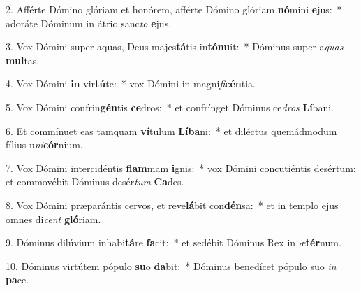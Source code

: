 2. Afférte Dómino glóriam et honórem, afférte Dómino glóriam \textbf{nó}mini \textbf{e}jus:~*  adoráte Dóminum in átrio sanc\textit{to} \textbf{e}jus.\

3. Vox Dómini super aquas, Deus majes\textbf{tá}tis in\textbf{tó}\textbf{nu}it:~*  Dóminus super a\textit{quas} \textbf{mul}tas.\

4. Vox Dómini \textbf{in} vir\textbf{tú}te:~*  vox Dómini in magni\textit{fi}\textbf{cén}tia.\

5. Vox Dómini confrin\textbf{gén}tis \textbf{ce}dros:~*  et confrínget Dóminus ce\textit{dros} \textbf{Lí}bani.\

6. Et commínuet eas tamquam \textbf{ví}tulum \textbf{Lí}\textbf{ba}ni:~*  et diléctus quemádmodum fílius u\textit{ni}\textbf{cór}nium.\

7. Vox Dómini intercidéntis \textbf{flam}mam \textbf{i}gnis:~*  vox Dómini concutiéntis desértum: et commovébit Dóminus desér\textit{tum} \textbf{Ca}des.\

8. Vox Dómini præparántis cervos, et reve\textbf{lá}bit con\textbf{dén}sa:~*  et in templo ejus omnes di\textit{cent} \textbf{gló}riam.\

9. Dóminus dilúvium inhabi\textbf{tá}re \textbf{fa}cit:~*  et sedébit Dóminus Rex in \textit{æ}\textbf{tér}num.\

10. Dóminus virtútem pópulo \textbf{su}o \textbf{da}bit:~*  Dóminus benedícet pópulo suo \textit{in} \textbf{pa}ce.\

